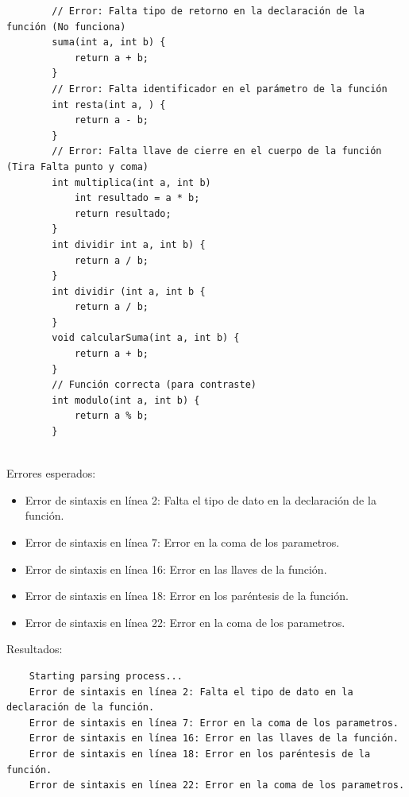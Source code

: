 \documentclass[a4paper,12pt]{article}
\begin{document}
\begin{flushleft}
	\begin{verbatim}
		// Error: Falta tipo de retorno en la declaración de la función (No funciona)
		suma(int a, int b) {
			return a + b;
		}
		// Error: Falta identificador en el parámetro de la función
		int resta(int a, ) {
			return a - b;
		}
		// Error: Falta llave de cierre en el cuerpo de la función (Tira Falta punto y coma)
		int multiplica(int a, int b) 
			int resultado = a * b;
			return resultado;
		}
		int dividir int a, int b) {
			return a / b;
		}
		int dividir (int a, int b {
			return a / b;
		}
		void calcularSuma(int a, int b) {
			return a + b;
		}
		// Función correcta (para contraste)
		int modulo(int a, int b) {
			return a % b;
		}
	
	\end{verbatim}
	Errores esperados:
	\begin{itemize} 
	\item Error de sintaxis en línea 2: Falta el tipo de dato en la declaración de la función.
	\item Error de sintaxis en línea 7: Error en la coma de los parametros.
	\item Error de sintaxis en línea 16: Error en las llaves de la función.
	\item Error de sintaxis en línea 18: Error en los paréntesis de la función.
	\item Error de sintaxis en línea 22: Error en la coma de los parametros.
	\end{itemize}

	Resultados:
	\begin{verbatim}
	Starting parsing process...
	Error de sintaxis en línea 2: Falta el tipo de dato en la declaración de la función.
	Error de sintaxis en línea 7: Error en la coma de los parametros.
	Error de sintaxis en línea 16: Error en las llaves de la función.
	Error de sintaxis en línea 18: Error en los paréntesis de la función.
	Error de sintaxis en línea 22: Error en la coma de los parametros.
	\end{verbatim}
\end{flushleft}

\newpage
\end{document}
